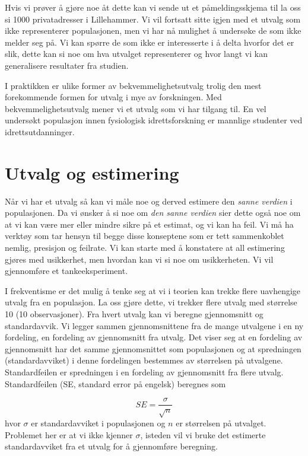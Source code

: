 \documentclass[
  letterpaper,
  DIV=11,
  numbers=noendperiod,
  oneside]{scrreprt}
\begin{document}
Hvis vi prøver å gjøre noe åt dette kan vi sende ut et påmeldingsskjema
til la oss si 1000 privatadresser i Lillehammer. Vi vil fortsatt sitte
igjen med et utvalg som ikke representerer populasjonen, men vi har nå
mulighet å undersøke de som ikke melder seg på. Vi kan spørre de som
ikke er interesserte i å delta hvorfor det er slik, dette kan si noe om
hva utvalget representerer og hvor langt vi kan generalisere resultater
fra studien.

I praktikken er ulike former av bekvemmelighetsutvalg trolig den mest
forekommende formen for utvalg i mye av forskningen. Med
bekvemmelighetsutvalg mener vi et utvalg som vi har tilgang til. En vel
undersøkt populasjon innen fysiologisk idrettsforskning er mannlige
studenter ved idrettsutdanninger.

\hypertarget{utvalg-og-estimering}{%
\section{Utvalg og estimering}\label{utvalg-og-estimering}}

Når vi har et utvalg så kan vi måle noe og derved estimere den
\emph{sanne verdien} i populasjonen. Da vi ønsker å si noe om \emph{den sanne
verdien} sier dette også noe om at vi kan være mer eller mindre sikre på
et estimat, og vi kan ha feil. Vi må ha verktøy som tar hensyn til begge
disse konseptene som er tett sammenkoblet nemlig, presisjon og feilrate.
Vi kan starte med å konstatere at all estimering gjøres med usikkerhet,
men hvordan kan vi si noe om usikkerheten. Vi vil gjennomføre et
tankeeksperiment.

I frekventisme er det mulig å tenke seg at vi i teorien kan trekke flere
uavhengige utvalg fra en populasjon. La oss gjøre dette, vi trekker
flere utvalg med størrelse 10 (10 observasjoner). Fra hvert utvalg kan
vi beregne gjennomsnitt og standardavvik. Vi legger sammen
gjennomsnittene fra de mange utvalgene i en ny fordeling, en fordeling
av gjennomsnitt fra utvalg. Det viser seg at en fordeling av
gjennomsnitt har det samme gjennomsnittet som populasjonen og at
spredningen (standardavviket) i denne fordelingen bestemmes av
størrelsen på utvalgene. Standardfeilen er spredningen i en fordeling av
gjennomsnitt fra flere utvalg. Standardfeilen (SE, standard error på
engelsk) beregnes som

\[SE = \frac{\sigma}{\sqrt{n}}\] hvor \(\sigma\) er standardavviket i
populasjonen og \(n\) er størrelsen på utvalget. Problemet her er at vi
ikke kjenner \(\sigma\), isteden vil vi bruke det estimerte
standardavviket fra et utvalg for å gjennomføre beregning.
\end{document}
